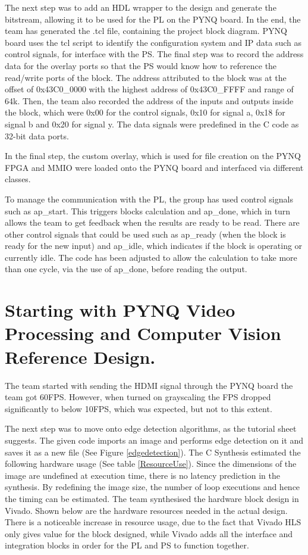 The next step was to add an HDL wrapper to the design and generate the bitstream, allowing it to be used for the PL on the PYNQ board. In the end, the team has generated the .tcl file, containing the project block diagram. PYNQ board uses the tcl script to identify the configuration system and IP data such as control signals, for interface with the PS.
The final step was to record the address data for the overlay ports so that the PS would know how to reference the read/write ports of the block. The address attributed to the block was at the offset of 0x43C0\_0000 with the highest address of 0x43C0\_FFFF and range of 64k. Then, the team also recorded the address of the inputs and outputs inside the block, which were 0x00 for the control signals, 0x10 for signal a, 0x18 for signal b and 0x20 for signal y.  The data signals were predefined in the C code as 32-bit data ports.

In the final step, the custom overlay, which is used for file creation on the PYNQ FPGA and MMIO were loaded onto the PYNQ board and interfaced via different classes. 

To manage the communication with the PL, the group has used control signals such as ap\_start. This triggers blocks calculation and ap\_done, which in turn allows the team to get feedback when the results are ready to be read. There are other control signals that could be used such as ap\_ready (when the block is ready for the new input) and ap\_idle, which indicates if the block is operating or currently idle\cite[p.303]{crockettelliottenderwitzstewart2014}. The code has been adjusted to allow the calculation to take more than one cycle, via the use of ap\_done, before reading the output.


\section{Starting with PYNQ Video Processing and Computer Vision Reference Design.}

The team started with sending the HDMI signal through the PYNQ board the team got 60FPS. However, when turned on grayscaling the FPS dropped significantly to below 10FPS, which was expected, but not to this extent.

The next step was to move onto edge detection algorithms, as the tutorial sheet suggests. The given code imports an image and performs edge detection on it and saves it as a new file (See Figure \ref{edgedetection}). The C Synthesis estimated the following hardware usage (See table \ref{ResourceUse}). Since the dimensions of the image are undefined at execution time, there is no latency prediction in the synthesis. By redefining the image size, the number of loop executions and hence the timing can be estimated. The team synthesised the hardware block design in Vivado. Shown below are the hardware resources needed in the actual design. There is a noticeable increase in resource usage, due to the fact that Vivado HLS only gives value for the block designed, while Vivado adds all the interface and integration blocks in order for the PL and PS to function together. 

